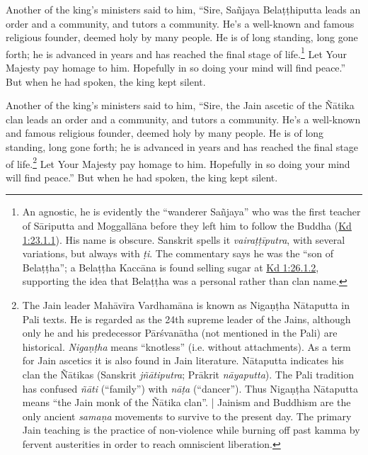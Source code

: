 \documentclass[12pt,openany]{book}%
\begin{document}
Another of the king’s ministers said to him, “Sire, \textsanskrit{Sañjaya} \textsanskrit{Belaṭṭhiputta} leads an order and a community, and tutors a community. He’s a well-known and famous religious founder, deemed holy by many people. He is of long standing, long gone forth; he is advanced in years and has reached the final stage of life.\footnote{An agnostic, he is evidently the “wanderer \textsanskrit{Sañjaya}” who was the first teacher of \textsanskrit{Sāriputta} and \textsanskrit{Moggallāna} before they left him to follow the Buddha (\href{https://suttacentral.net/pli-tv-kd1/en/sujato\#23.1.1}{Kd 1:23.1.1}). His name is obscure. Sanskrit spells it \textit{\textsanskrit{vairaṭṭīputra}}, with several variations, but always with \textit{\textsanskrit{ṭi}}. The commentary says he was the “son of \textsanskrit{Belaṭṭha}”; a \textsanskrit{Belaṭṭha} \textsanskrit{Kaccāna} is found selling sugar at \href{https://suttacentral.net/pli-tv-kd1/en/sujato\#26.1.2}{Kd 1:26.1.2}, supporting the idea that \textsanskrit{Belaṭṭha} was a personal rather than clan name. } Let Your Majesty pay homage to him. Hopefully in so doing your mind will find peace.” But when he had spoken, the king kept silent. 

Another of the king’s ministers said to him, “Sire, the Jain ascetic of the \textsanskrit{Ñātika} clan leads an order and a community, and tutors a community. He’s a well-known and famous religious founder, deemed holy by many people. He is of long standing, long gone forth; he is advanced in years and has reached the final stage of life.\footnote{The Jain leader \textsanskrit{Mahāvīra} \textsanskrit{Vardhamāna} is known as \textsanskrit{Nigaṇṭha} \textsanskrit{Nātaputta} in Pali texts. He is regarded as the 24th supreme leader of the Jains, although only he and his predecessor \textsanskrit{Pārśvanātha} (not mentioned in the Pali) are historical. \textit{\textsanskrit{Nigaṇṭha}} means “knotless” (i.e. without attachments). As a term for Jain ascetics it is also found in Jain literature. \textsanskrit{Nātaputta} indicates his clan the \textsanskrit{Ñātikas} (Sanskrit \textit{\textsanskrit{jñātiputra}}; \textsanskrit{Prākrit} \textit{\textsanskrit{nāyaputta}}). The Pali tradition has confused \textit{\textsanskrit{ñāti}}  (“family”) with \textit{\textsanskrit{nāṭa}} (“dancer”). Thus \textsanskrit{Nigaṇṭha} \textsanskrit{Nātaputta} means “the Jain monk of the \textsanskrit{Ñātika} clan”. | Jainism and Buddhism are the only ancient \textit{\textsanskrit{samaṇa}} movements to survive to the present day. The primary Jain teaching is the practice of non-violence while burning off past kamma by fervent austerities in order to reach omniscient liberation. } Let Your Majesty pay homage to him. Hopefully in so doing your mind will find peace.” But when he had spoken, the king kept silent. 
\end{document}
